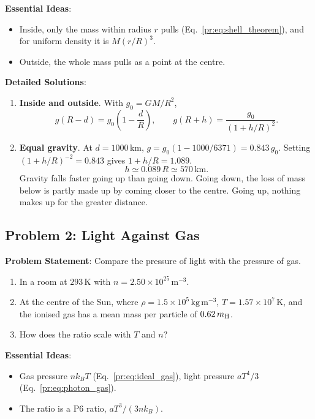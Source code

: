 \textbf{Essential Ideas}:
\begin{itemize}
	\item Inside, only the mass within radius $r$ pulls (Eq.~\eqref{pr:eq:shell_theorem}), and for uniform density it is $M(r/R)^3$.
	\item Outside, the whole mass pulls as a point at the centre.
\end{itemize}

\textbf{Detailed Solutions}:
\begin{enumerate}[label=(\alph*)]
	\item \textbf{Inside and outside}. With $g_0=GM/R^2$,
	\[
	\boxed{g(R-d)=g_0\left(1-\frac dR\right),\qquad g(R+h)=\frac{g_0}{(1+h/R)^2}.}
	\]
	\item \textbf{Equal gravity}. At $d=1000\,\mathrm{km}$, $g=g_0(1-1000/6371)=0.843\,g_0$. Setting $(1+h/R)^{-2}=0.843$ gives $1+h/R=1.089$.
	\[
	\boxed{h\simeq0.089\,R\simeq570\,\mathrm{km}.}
	\]
	Gravity falls faster going up than going down. Going down, the loss of mass below is partly made up by coming closer to the centre. Going up, nothing makes up for the greater distance.
\end{enumerate}

\subsection{Problem 2: Light Against Gas}
\label{pr:prob:prad}

\textbf{Problem Statement}: Compare the pressure of light with the pressure of gas.
\begin{enumerate}[label=(\alph*)]
	\item In a room at $293\,\mathrm K$ with $n=2.50\times10^{25}\,\mathrm{m^{-3}}$.
	\item At the centre of the Sun, where $\rho=1.5\times10^5\,\mathrm{kg\,m^{-3}}$, $T=1.57\times10^7\,\mathrm K$, and the ionised gas has a mean mass per particle of $0.62\,m_{\rm H}$.
	\item How does the ratio scale with $T$ and $n$?
\end{enumerate}

\textbf{Essential Ideas}:
\begin{itemize}
	\item Gas pressure $nk_BT$ (Eq.~\eqref{pr:eq:ideal_gas}), light pressure $aT^4/3$ (Eq.~\eqref{pr:eq:photon_gas}).
	\item The ratio is a P6 ratio, $aT^3/(3nk_B)$.
\end{itemize}

